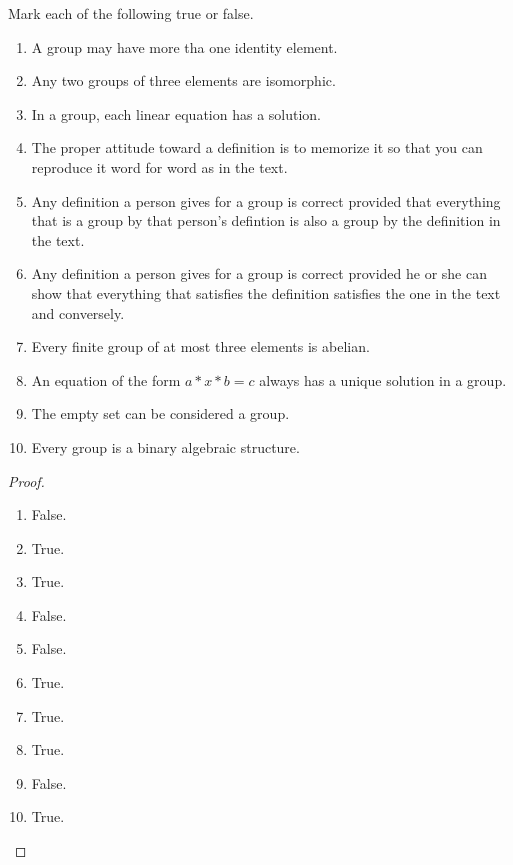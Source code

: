 \begin{exercise}
    Mark each of the following true or false.
    \begin{enumerate}[label={\textbf{\alph*.}}]
        \item A group may have more tha one identity element.
        \item Any two groups of three elements are isomorphic.
        \item In a group, each linear equation has a solution.
        \item The proper attitude toward a definition is to memorize it so that you can reproduce it word for word as in the text.
        \item Any definition a person gives for a group is correct provided that everything that is a group by that person's defintion is also a group by the definition in the text.
        \item Any definition a person gives for a group is correct provided he or she can show that everything that satisfies the definition satisfies the one in the text and conversely.
        \item Every finite group of at most three elements is abelian.
        \item An equation of the form $a * x * b = c$ always has a unique solution in a group.
        \item The empty set can be considered a group.
        \item Every group is a binary algebraic structure.
    \end{enumerate}
\end{exercise}

\begin{proof}
    \begin{enumerate}[label={\textbf{\alph*.}}]
        \item False.
        \item True.
        \item True.
        \item False.
        \item False.
        \item True.
        \item True.
        \item True.
        \item False.
        \item True.
    \end{enumerate}
\end{proof}

